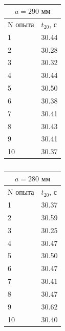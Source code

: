 \documentclass[a4paper]{article}
\begin{document}
\begin{itemize}
\begin{table}
\begin{minipage}{0.32\linewidth}
\centering
\begin{tabular}{|l|l|}
\hline
\multicolumn{2}{|c|}{$a = 290 \text{ мм}$} \\
\hline
N опыта & $t_{20}$, с  \\
\hline
1       & 30.44             \\
\hline
2       & 30.28             \\
\hline
3       & 30.32           \\
\hline
4       & 30.44             \\
\hline
5       & 30.50             \\
\hline
6       & 30.38             \\
\hline
7       & 30.41            \\
\hline
8       & 30.43             \\
\hline
9       & 30.41             \\
\hline
10      & 30.37     \\
\hline       
\end{tabular}
\caption{}
\end{minipage}
\begin{minipage}{0.32\linewidth}
\centering
\begin{tabular}{|l|l|}
\hline
\multicolumn{2}{|c|}{$a = 280 \text{ мм}$} \\
\hline
N опыта & $t_{20}$, с  \\
\hline
1       &   30.37          \\
\hline
2       &   30.59             \\
\hline
3       &   30.25            \\
\hline
4       &   30.47            \\
\hline
5       &   30.50           \\
\hline
6       &   30.47             \\
\hline
7       &   30.41           \\
\hline
8       &   30.47             \\
\hline
9       &   30.62             \\
\hline
10      &   30.40    \\
\hline       
\end{tabular}
\caption{}
\end{minipage}
\begin{minipage}{0.32\linewidth}
\centering
\begin{tabular}{|l|l|}

\end{tabular}
\end{minipage}
\end{table}
\end{itemize}
\end{document}
